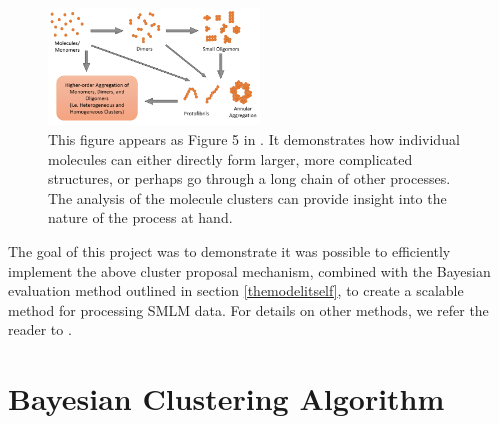 \documentclass[11pt]{article}
\begin{document}
\begin{figure}[t!] 
	\centering
	\includegraphics[width=0.5\textwidth]{figs/fig5FromKhater.png}
	\caption{This figure appears as Figure 5 in \cite{Khater2020}. It demonstrates how individual molecules can either directly form larger, more complicated structures, or perhaps go through a long chain of other processes. The analysis of the molecule clusters can provide insight into the nature of the process at hand. }
	\label{fig5FromKhater}
\end{figure}




The goal of this project was to demonstrate it was possible to efficiently implement the above cluster proposal mechanism, combined with the Bayesian evaluation method outlined in section \ref{themodelitself}, to create a scalable method for processing SMLM data. For details on other methods, we refer the reader to \cite{Lelek2021}.





\section{Bayesian Clustering Algorithm} \label{bayesianClusteringAlgorithm}

\end{document}
